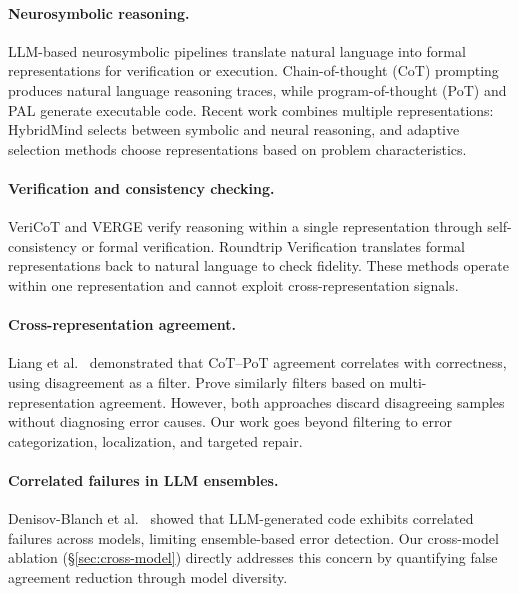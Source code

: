 \documentclass[11pt,a4paper]{article}
\begin{document}
\paragraph{Neurosymbolic reasoning.}
LLM-based neurosymbolic pipelines translate natural language into formal representations for verification or execution. Chain-of-thought (CoT) prompting \cite{wei2022cot} produces natural language reasoning traces, while program-of-thought (PoT) and PAL \cite{chen2022pot,gao2023pal} generate executable code. Recent work combines multiple representations: HybridMind \cite{hybridmind2024} selects between symbolic and neural reasoning, and adaptive selection methods \cite{adaptive2024} choose representations based on problem characteristics.

\paragraph{Verification and consistency checking.}
VeriCoT \cite{vericot2024} and VERGE \cite{verge2024} verify reasoning within a single representation through self-consistency or formal verification. Roundtrip Verification \cite{roundtrip2026} translates formal representations back to natural language to check fidelity. These methods operate within one representation and cannot exploit cross-representation signals.

\paragraph{Cross-representation agreement.}
Liang et al.\ \cite{liang2024cotpot} demonstrated that CoT--PoT agreement correlates with correctness, using disagreement as a filter. Prove \cite{prove2024} similarly filters based on multi-representation agreement. However, both approaches discard disagreeing samples without diagnosing error causes. Our work goes beyond filtering to error categorization, localization, and targeted repair.

\paragraph{Correlated failures in LLM ensembles.}
Denisov-Blanch et al.\ \cite{denisovblanch2026} showed that LLM-generated code exhibits correlated failures across models, limiting ensemble-based error detection. Our cross-model ablation (\S\ref{sec:cross-model}) directly addresses this concern by quantifying false agreement reduction through model diversity.
\end{document}
